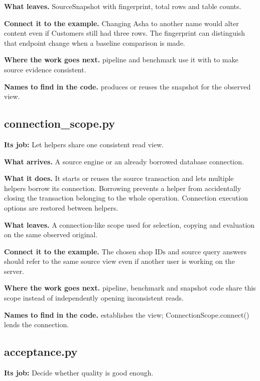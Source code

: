 \textbf{What leaves.} SourceSnapshot with fingerprint, total rows and table counts.

\textbf{Connect it to the example.} Changing Asha to another name would alter content even if Customers still had three rows. The fingerprint can distinguish that endpoint change when a baseline comparison is made.

\textbf{Where the work goes next.} pipeline and benchmark use it with  to make source evidence consistent.

\textbf{Names to find in the code.}  produces or reuses the snapshot for the observed view.


\subsection{connection\_scope.py}

\textbf{Its job:} Let helpers share one consistent read view.

\textbf{What arrives.} A source engine or an already borrowed database connection.

\textbf{What it does.} It starts or reuses the source transaction and lets multiple helpers borrow its connection. Borrowing prevents a helper from accidentally closing the transaction belonging to the whole operation. Connection execution options are restored between helpers.

\textbf{What leaves.} A connection-like scope used for selection, copying and evaluation on the same observed original.

\textbf{Connect it to the example.} The chosen shop IDs and source query answers should refer to the same source view even if another user is working on the server.

\textbf{Where the work goes next.} pipeline, benchmark and snapshot code share this scope instead of independently opening inconsistent reads.

\textbf{Names to find in the code.}  establishes the view; ConnectionScope.connect() lends the connection.


\subsection{acceptance.py}

\textbf{Its job:} Decide whether quality is good enough.

